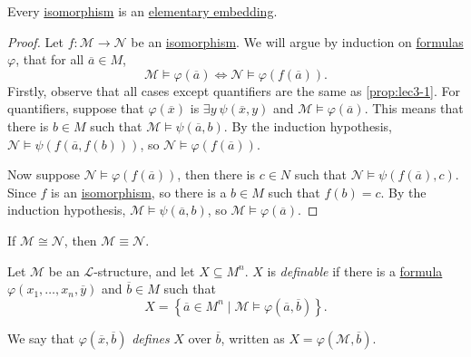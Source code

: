 \begin{proposition}
	Every \hyperref[def:isomorphism]{isomorphism} is an \hyperref[def:elementary-embedding]{elementary embedding}.
\end{proposition}
\begin{proof}
	Let \(f\colon \mathcal{M} \to  \mathcal{N} \) be an \hyperref[def:isomorphism]{isomorphism}. We will argue by induction on \hyperref[def:formula]{formulas} \(\varphi \), that for all \(\overline{a} \in M\),
	\[
		\mathcal{M} \models \varphi (\overline{a} ) \iff \mathcal{N} \models \varphi (f(\overline{a} )).
	\]
	Firstly, observe that all cases except quantifiers are the same as \autoref{prop:lec3-1}. For quantifiers, suppose that \(\varphi (\overline{x} )\) is \(\exists y\ \psi (\overline{x} , y)\) and \(\mathcal{M} \models \varphi (\overline{a} )\). This means that there is \(b\in M\) such that \(\mathcal{M} \models \psi (\overline{a} , b)\). By the induction hypothesis, \(\mathcal{N} \models \psi (f(\overline{a} , f(b)))\), so \(\mathcal{N} \models \varphi (f(\overline{a} ))\).

	Now suppose \(\mathcal{N} \models \varphi (f(\overline{a} ))\), then there is \(c\in N\) such that \(\mathcal{N} \models \psi (f(\overline{a} ), c)\). Since \(f\) is an \hyperref[def:isomorphism]{isomorphism}, so there is a \(b\in M\) such that \(f(b) = c\). By the induction hypothesis, \(\mathcal{M} \models \psi (\overline{a} , b)\), so \(\mathcal{M} \models \varphi (\overline{a} )\).
\end{proof}

\begin{corollary}
	If \(\mathcal{M} \cong \mathcal{N} \), then \(\mathcal{M} \equiv \mathcal{N} \).
\end{corollary}

\begin{definition}\label{def:definable-set}
	Let \(\mathcal{M} \) be an \(\mathcal{L} \)-structure, and let \(X \subseteq M ^n\). \(X\) is \emph{definable} if there is a \hyperref[def:formula]{formula} \(\varphi (x_1, \ldots , x_n, \overline{y} )\) and \(\overline{b} \in M\) such that
	\[
		X = \left\{ \overline{a} \in M^n \mid \mathcal{M} \models \varphi (\overline{a} , \overline{b} ) \right\}.
	\]
\end{definition}

\begin{notation}[Define]\label{not:define}
	We say that \(\varphi (\overline{x} , \overline{b} )\) \emph{defines} \(X\) over \(\overline{b} \), written as \(X = \varphi (\mathcal{M} , \overline{b} )\).
\end{notation}

